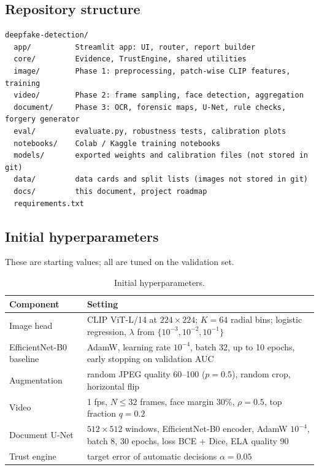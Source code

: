 \documentclass[11pt,a4paper]{article}
\begin{document}
\subsection{Repository structure}
{\small
\begin{verbatim}
deepfake-detection/
  app/          Streamlit app: UI, router, report builder
  core/         Evidence, TrustEngine, shared utilities
  image/        Phase 1: preprocessing, patch-wise CLIP features, training
  video/        Phase 2: frame sampling, face detection, aggregation
  document/     Phase 3: OCR, forensic maps, U-Net, rule checks, forgery generator
  eval/         evaluate.py, robustness tests, calibration plots
  notebooks/    Colab / Kaggle training notebooks
  models/       exported weights and calibration files (not stored in git)
  data/         data cards and split lists (images not stored in git)
  docs/         this document, project roadmap
  requirements.txt
\end{verbatim}
}

\subsection{Initial hyperparameters}
These are starting values; all are tuned on the validation set.

\begin{table}[htbp]
\centering
\small
\begin{tabularx}{\linewidth}{@{}l Y@{}}
\toprule
\textbf{Component} & \textbf{Setting} \\
\midrule
Image head & CLIP ViT-L/14 at $224{\times}224$; $K=64$ radial bins; logistic regression, $\lambda$ from $\{10^{-3},10^{-2},10^{-1}\}$ \\
EfficientNet-B0 baseline & AdamW, learning rate $10^{-4}$, batch 32, up to 10 epochs, early stopping on validation AUC \\
Augmentation & random JPEG quality 60--100 ($p=0.5$), random crop, horizontal flip \\
Video & 1 fps, $N\le32$ frames, face margin 30\%, $\rho=0.5$, top fraction $q=0.2$ \\
Document U-Net & $512{\times}512$ windows, EfficientNet-B0 encoder, AdamW $10^{-4}$, batch 8, 30 epochs, loss BCE + Dice, ELA quality 90 \\
Trust engine & target error of automatic decisions $\alpha=0.05$ \\
\bottomrule
\end{tabularx}
\caption{Initial hyperparameters.}
\label{tab:hparams}
\end{table}
\end{document}
